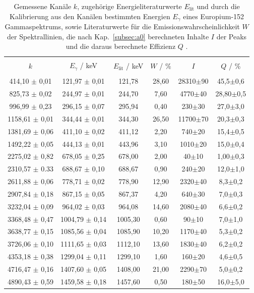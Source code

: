 \begin{table}
\centering
\caption{Gemessene Kanäle $k$, zugehörige Energieliteraturwerte $E_{\text{lit}}$ und durch die Kalibrierung aus den Kanälen bestimmten Energien $E_{\gamma}$ eines Europium-152 Gammaspektrums, sowie Literaturwerte für die Emissionswahrscheinlichkeit $W$ der Spektrallinien, die nach Kap.~\ref{subsec:a0} berechneten Inhalte $I$ der Peaks und die daraus berechnete Effizienz $Q$ \cite{sample}.}
\begin{tabular}{c c c c c c}
\hline \\
$k$ &$E_{\gamma}$ / keV & $E_{\text{lit}}$ / keV &  $W$ / \% & $I$ & $Q$ / \% \\
\hline \\
414,10 $\pm$ 0,01 & 121,97 $\pm$ 0,01 & 121,78 & 28,60 & 28310$\pm$90 & 45,5$\pm$0,6 \\
825,73 $\pm$ 0,02 & 244,97 $\pm$ 0,01 & 244,70 & 7,60 & 4770$\pm$40 & 28,80$\pm$0,5 \\  
996,99 $\pm$ 0,23 & 296,15 $\pm$ 0,07 & 295,94 & 0,40 & 230$\pm$30 & 27,0$\pm$3,0 \\ 
1158,61 $\pm$ 0,01 & 344,44 $\pm$ 0,01 & 344,30 & 26,50 & 11700$\pm$70 & 20,3$\pm$0,3 \\
1381,69 $\pm$ 0,06 & 411,10 $\pm$ 0,02 & 411,12 & 2,20 & 740$\pm$20 & 15,4$\pm$0,5 \\
1492,22 $\pm$ 0,05 & 444,13 $\pm$ 0,01 & 443,96 & 3,10 & 1010$\pm$20 & 15,0$\pm$0,4 \\ 
2275,02 $\pm$ 0,82 & 678,05 $\pm$ 0,25 & 678,00 & 2,00 & 40$\pm$10 & 1,00$\pm$0,3 \\ 
2310,57 $\pm$ 0.33 & 688,67 $\pm$ 0,10 & 688,67 & 0,90 & 240$\pm$20 & 12,0$\pm$1,0 \\
2611,88 $\pm$ 0,06 & 778,71 $\pm$ 0,02 & 778,90 & 12,90 & 2320$\pm$40 & 8,3$\pm$0,2 \\ 
2907,84 $\pm$ 0,18 & 867,15 $\pm$ 0,05 & 867,37 & 4,20 & 640$\pm$30 & 7,0$\pm$0,3 \\ 
3232,04 $\pm$ 0,09 & 964,02 $\pm$ 0,03 & 964,08 & 14,60 & 2080$\pm$40 & 6,6$\pm$0,2 \\ 
3368,48 $\pm$ 0,47 & 1004,79 $\pm$ 0,14 & 1005,30 & 0,60 & 90$\pm$10 & 7,0$\pm$1,0 \\ 
3638,77 $\pm$ 0,15 & 1085,56 $\pm$ 0,04 & 1085,90 & 10,20 & 1170$\pm$40 & 5,3$\pm$0,2 \\  
3726,06 $\pm$ 0,10 & 1111,65 $\pm$ 0,03 & 1112,10 & 13,60 & 1830$\pm$40 & 6,2$\pm$0,2 \\ 
4353,18 $\pm$ 0,38 & 1299,04 $\pm$ 0,11 & 1299,10 & 1,60 & 160$\pm$20 & 4,6$\pm$0,5 \\
4716,47 $\pm$ 0,16 & 1407,60 $\pm$ 0,05 & 1408,00 & 21,00 & 2290$\pm$70 & 5,0$\pm$0,2 \\ 
4890,43 $\pm$ 0,59 & 1459,58 $\pm$ 0,18 & 1457,60 & 0,50 & 180$\pm$50 & 16,0$\pm$5,0\\
\hline
\end{tabular}
\label{tab:atab1}
\end{table}
